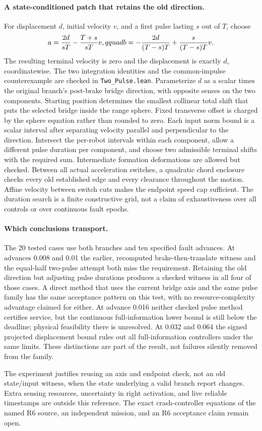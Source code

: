 \documentclass{article}
\begin{document}
\paragraph{A state-conditioned patch that retains the old direction.}
For displacement $d$, initial velocity $v$, and a first pulse
lasting $s$ out of $T$, choose
\[
 a={2d\over sT}-{T+s\over sT}v,qquad
 b=-{2d\over (T-s)T}+{s\over (T-s)T}v.
\]
The resulting terminal velocity is zero and the displacement is
exactly $d$, coordinatewise. The two integration identities and the
common-impulse counterexample are checked in \verb|Two_Pulse.lean|.
Parameterize $d$ as a scalar times the original branch's post-brake
bridge direction, with opposite senses on the two components.
Starting position determines the smallest collinear total shift
that puts the selected bridge inside the range sphere. Fixed
transverse offset is charged by the sphere equation rather than
rounded to zero. Each input norm bound is a scalar interval after
separating velocity parallel and perpendicular to the direction.
Intersect the per-robot intervals within each component, allow a
different pulse duration per component, and choose two admissible
terminal shifts with the required sum. Intermediate formation
deformations are allowed but checked. Between all actual acceleration
switches, a quadratic chord enclosure checks every old established
edge and every clearance throughout the motion. Affine velocity
between switch cuts makes the endpoint speed cap sufficient.
The duration search is a finite constructive grid, not a claim of
exhaustiveness over all controls or over continuous fault epochs.

\paragraph{Which conclusions transport.}
The 20 tested cases use both branches and ten specified fault
advances. At advances 0.008 and 0.01 the earlier, recomputed
brake-then-translate witness and the equal-half two-pulse attempt
both miss the requirement. Retaining the old direction but
adjusting pulse durations produces a checked witness in all four
of those cases. A direct method that uses the current bridge axis
and the same pulse family has the same acceptance pattern on this
test, with no resource-complexity advantage claimed for either.
At advance 0.016 neither checked pulse method certifies service,
but the continuous full-information lower bound is still below
the deadline; physical feasibility there is unresolved. At
0.032 and 0.064 the signed projected displacement bound rules
out all full-information controllers under the same limits.
These distinctions are part of the result, not failures silently
removed from the family.

The experiment justifies reusing an axis and endpoint check,
not an old state/input witness, when the state underlying a valid
branch report changes. Extra sensing resources, uncertainty in
right activation, and live reliable timestamps are outside this
reference. The exact crash-controller equations of the named R6
source, an independent mission, and an R6 acceptance claim remain
open.
\end{document}

